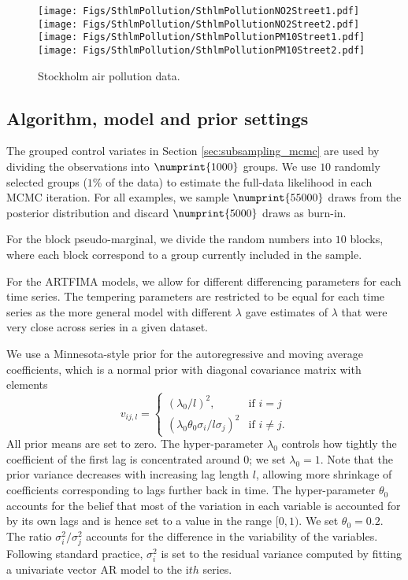 \documentclass[11pt,english,oneside]{amsart}
\numberwithin{equation}{section}
\theoremstyle{plain}
\numberwithin{equation}{section}
\begin{document}
\begin{figure}\label{fig:SthlmPollutionData}
    \texttt{[image: Figs/SthlmPollution/SthlmPollutionNO2Street1.pdf]}
    \texttt{[image: Figs/SthlmPollution/SthlmPollutionNO2Street2.pdf]} \\
    \texttt{[image: Figs/SthlmPollution/SthlmPollutionPM10Street1.pdf]}
    \texttt{[image: Figs/SthlmPollution/SthlmPollutionPM10Street2.pdf]}
    \caption{Stockholm air pollution data.}
\end{figure}

\subsection{Algorithm, model and prior settings}
The grouped control variates in Section \ref{sec:subsampling_mcmc} are used by dividing the observations into $\numprint{1000}$ groups. We use $10$ randomly selected groups ($1$\% of the data) to estimate the full-data likelihood in each MCMC iteration. For all examples, we sample $\numprint{55000}$ draws from the posterior distribution and discard $\numprint{5000}$ draws as burn-in.

For the block pseudo-marginal, we divide the random numbers into $10$ blocks, where each block correspond to a group currently included in the sample. 

For the ARTFIMA models, we allow for different differencing parameters for each time series. The tempering parameters are restricted to be equal for each time series as the more general model with different $\lambda$ gave estimates of $\lambda$ that were very close across series in a given dataset.

We use a Minnesota-style prior \citep{doan1984forecasting} for the autoregressive and moving average coefficients, which is a normal prior with diagonal covariance matrix with elements
$$v_{ij,l}=\begin{cases} (\lambda_0/l)^2, &\mbox{if } i = j \\
(\lambda_0 \theta_0\sigma_i/l\sigma_j)^2 & \mbox{if } i \neq j. \end{cases} 
$$
All prior means are set to zero. The hyper-parameter $\lambda_0$ controls how tightly the coefficient of the first lag is concentrated around 0;  we set $\lambda_0=1$. Note that the prior variance decreases with increasing lag length $l$, allowing more shrinkage of coefficients corresponding to lags further back in time. The hyper-parameter $\theta_0$ accounts for the belief that most of the variation in each variable is accounted for by its own lags and is hence set to a value in the range $[0,1)$. We set $\theta_0=0.2$. The ratio $\sigma^2_i/\sigma^2_j$ accounts for the difference in the variability of the variables. Following standard practice, $\sigma^2_i$ is set to the residual variance computed by fitting a univariate vector AR model to the i$th$ series. 
\end{document}
